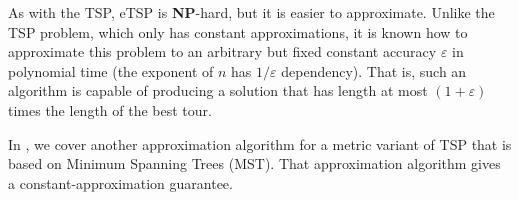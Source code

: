 \begin{cluster}
\label{grp:grm:design::dc::etsp}

\begin{gram}
\label{grm:design::dc::etsp}
As with the TSP, eTSP is \textbf{NP}-hard, but it is easier to
approximate.
Unlike the TSP problem, which only has constant approximations, it is
known how to approximate this problem to an arbitrary but fixed
constant accuracy $\varepsilon$ in polynomial time (the exponent of
$n$ has $1/\varepsilon$ dependency).
That is, such an algorithm is capable of producing a solution that has
length at most $(1+\varepsilon)$ times the length of the best tour.

\end{gram}
\end{cluster}

\begin{cluster}
\label{grp:nt:design::dc::genome}

\begin{note}
\label{nt:design::dc::genome}
In , we cover another approximation algorithm for a
metric variant of TSP that is based on Minimum Spanning Trees (MST).
That approximation algorithm gives a constant-approximation guarantee.

\end{note}
\end{cluster}

